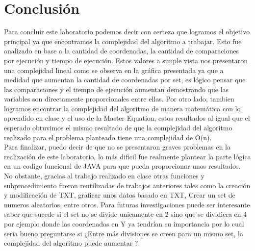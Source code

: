\section{Conclusión}
Para concluir este laboratorio podemos decir con certeza que logramos el objetivo principal ya que encontramos la complejidad del algoritmo a trabajar. Esto fue analizado en base a la cantidad de coordenadas, la cantidad de comparaciones por ejecución y tiempo de ejecución. Estos valores a simple vista nos presentaron una complejidad lineal como se observa en la gráfica presentada ya que a medidad que aumentan la cantidad de coordenadas por set, es lógico pensar que las comparaciones y el tiempo de ejecución aumentan demostrando que las variables son directamente proporcionales entre ellas. Por otro lado, tambien logramos encontrar la complejidad del algoritmo de manera matemática con lo aprendido en clase y el uso de la Master Equation, estos resultados al igual que el esperado obtuvimos el mismo resultado de que la complejidad del algoritmo realizado para el problema planteado tiene una complejidad de O(n). \\

Para finalizar, puedo decir de que no se presentaron graves problemas en la realización de este laboratorio, lo más dificil fue realmente plantear la parte lógica en un codigo funcional de JAVA para que pueda proporcionar unos resultados. No obstante, gracias al trabajo realizado en clase otras funciones y subprocedimiento fueron reutilizadas de trabajos anteriores tales como la creación y modificación de TXT, graficar unos datos basado en TXT, Crear un set de numeros aleatorios, entre otros. Para futuras investigaciones puede ser interesante saber que sucede si el set no se divide unicamente en 2 sino que se dividiera en 4 por ejemplo donde las coordenadas en Y ya tendrían su importancia por lo cual sería bueno preguntarse si ¿Entre más divisiones se creen para un mismo set, la complejidad del algoritmo puede aumentar ?.